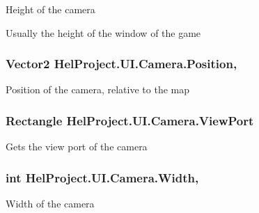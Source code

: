 Height of the camera 

Usually the height of the window of the game \hypertarget{class_hel_project_1_1_u_i_1_1_camera_abe879707e0bdcebf2e1c9a4e21440876}{}
\subsubsection[{Position}]{\setlength{\rightskip}{0pt plus 5cm}Vector2 Hel\+Project.\+U\+I.\+Camera.\+Position\hspace{0.3cm}{\ttfamily [get]}, {\ttfamily [set]}}\label{class_hel_project_1_1_u_i_1_1_camera_abe879707e0bdcebf2e1c9a4e21440876}


Position of the camera, relative to the map 

\hypertarget{class_hel_project_1_1_u_i_1_1_camera_a95599103c122a9b40fb225603788b6ed}{}
\subsubsection[{View\+Port}]{\setlength{\rightskip}{0pt plus 5cm}Rectangle Hel\+Project.\+U\+I.\+Camera.\+View\+Port\hspace{0.3cm}{\ttfamily [get]}}\label{class_hel_project_1_1_u_i_1_1_camera_a95599103c122a9b40fb225603788b6ed}


Gets the view port of the camera 

\hypertarget{class_hel_project_1_1_u_i_1_1_camera_ad16cc9589cf14533997a8f090c67f509}{}
\subsubsection[{Width}]{\setlength{\rightskip}{0pt plus 5cm}int Hel\+Project.\+U\+I.\+Camera.\+Width\hspace{0.3cm}{\ttfamily [get]}, {\ttfamily [set]}}\label{class_hel_project_1_1_u_i_1_1_camera_ad16cc9589cf14533997a8f090c67f509}


Width of the camera 


